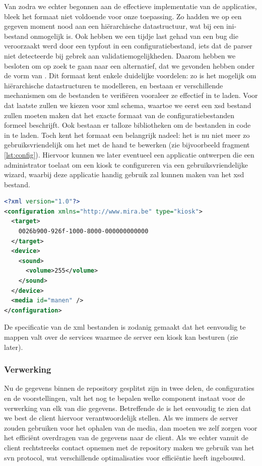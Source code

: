 Van zodra we echter begonnen aan de effectieve implementatie van de applicaties, bleek het formaat niet voldoende voor onze toepassing. Zo hadden we op een gegeven moment nood aan een hiërarchische datastructuur, wat bij een ini-bestand onmogelijk is. Ook hebben we een tijdje last gehad van een bug die veroorzaakt werd door een typfout in een configuratiebestand, iets dat de parser niet detecteerde bij gebrek aan validatiemogelijkheden. Daarom hebben we besloten om op zoek te gaan naar een alternatief, dat we gevonden hebben onder de vorm van . Dit formaat kent enkele duidelijke voordelen: zo is het mogelijk om hiërarchische datastructuren te modelleren, en bestaan er verschillende mechanismen om de bestanden te verifiëren vooraleer ze effectief in te laden. Voor dat laatste zullen we kiezen voor \ac{xml} schema, waartoe we eerst een \ac{xsd} bestand zullen moeten maken dat het exacte formaat van de configuratiebestanden formeel beschrijft. Ook bestaan er talloze bibliotheken om de bestanden in code in te laden. Toch kent het formaat een belangrijk nadeel: het is nu niet meer zo gebruiksvriendelijk om het met de hand te bewerken (zie bijvoorbeeld fragment \ref{lst:config}). Hiervoor kunnen we later eventueel een applicatie ontwerpen die een administrator toelaat om een kiosk te configureren via een gebruiksvriendelijke wizard, waarbij deze applicatie handig gebruik zal kunnen maken van het \ac{xsd} bestand. 

\begin{lstlisting}[language=XML, float, caption=Voorbeeld van een kiosk configuratiebstand., label=lst:config]
<?xml version="1.0"?>
<configuration xmlns="http://www.mira.be" type="kiosk">
  <target>
    0026b900-926f-1000-8000-000000000000
  </target>
  <device>
    <sound>
      <volume>255</volume>
    </sound>
  </device>
  <media id="manen" />
</configuration>
\end{lstlisting}

De specificatie van de \ac{xml} bestanden is zodanig gemaakt dat het eenvoudig te mappen valt over de services waarmee de server een kiosk kan besturen (zie later).

\subsubsection{Verwerking}

Nu de gegevens binnen de repository gesplitst zijn in twee delen, de configuraties en de voorstellingen, valt het nog te bepalen welke component instaat voor de verwerking van elk van die gegevens. Betreffende de  is het eenvoudig te zien dat we best de client hiervoor verantwoordelijk stellen. Als we immers de server zouden gebruiken voor het ophalen van de media, dan moeten we zelf zorgen voor het efficiënt overdragen van de gegevens naar de client. Als we echter vanuit de client rechtstreeks contact opnemen met de repository maken we gebruik van het \ac{svn} protocol, wat verschillende optimalisaties voor efficiëntie heeft ingebouwd.

